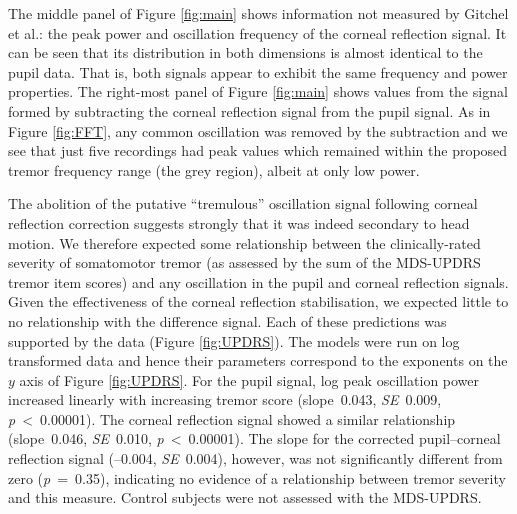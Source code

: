 \documentclass[jou,a4paper]{apa6}
\begin{document}
The middle panel of Figure \ref{fig:main} shows information not measured by Gitchel et al.: the peak power and oscillation frequency of the corneal reflection signal. It can be seen that its distribution in both dimensions is almost identical to the pupil data. That is, both signals appear to exhibit the same frequency and power properties. The right-most panel of Figure \ref{fig:main} shows values from the signal formed by subtracting the corneal reflection signal from the pupil signal. As in Figure \ref{fig:FFT}, any common oscillation was removed by the subtraction and we see that just five recordings had peak values which remained within the proposed tremor frequency range (the grey region), albeit at only low power.

The abolition of the putative ``tremulous'' oscillation signal following corneal reflection correction suggests strongly that it was indeed secondary to head motion. We therefore expected some relationship between the clinically-rated severity of somatomotor tremor (as assessed by the sum of the MDS-UPDRS tremor item scores) and any oscillation in the pupil and corneal reflection signals. Given the effectiveness of the corneal reflection stabilisation, we expected little to no relationship with the difference signal. Each of these predictions was supported by the data (Figure \ref{fig:UPDRS}). The models were run on log transformed data and hence their parameters correspond to the exponents on the $y$ axis of Figure \ref{fig:UPDRS}. For the pupil signal, log peak oscillation power increased linearly with increasing tremor score (slope~0.043, \textit{SE}~0.009, \textit{p}~<~0.00001). The corneal reflection signal showed a similar relationship (slope~0.046, \textit{SE}~0.010, \textit{p}~<~0.00001). The slope for the corrected pupil--corneal reflection signal (--0.004, \textit{SE}~0.004), however, was not significantly different from zero (\textit{p}~=~0.35), indicating no evidence of a relationship between tremor severity and this measure. Control subjects were not assessed with the MDS-UPDRS.
\end{document}
